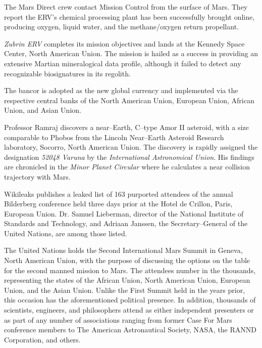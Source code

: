 The Mars Direct crew contact Mission Control from the surface of Mars. They report the ERV's chemical processing plant has been successfully brought online, producing oxygen, liquid water, and the methane/oxygen return propellant.
\StopTimelineDate

{\it Zubrin ERV} completes its mission objectives and lands at the Kennedy Space Center, North American Union. The mission is hailed as a success in providing an extensive Martian mineralogical data profile, although it failed to detect any recognizable biosignatures in its regolith.
\StopTimelineDate

The bancor is adopted as the new global currency and implemented via the respective central banks of the North American Union, European Union, African Union, and Asian Union.
\StopTimelineDate



Professor Ramraj discovers a near--Earth, C--type Amor II asteroid, with a size comparable to Phobos from the Lincoln Near--Earth Asteroid Research laboratory, Socorro, North American Union. The discovery is rapidly assigned the designation {\it 52048 Varuna} by the {\it International Astronomical Union}. His findings are chronicled in the {\it Minor Planet Circular} where he calculates a near collision trajectory with Mars.
\StopTimelineDate

Wikileaks publishes a leaked list of 163 purported attendees of the annual Bilderberg conference held three days prior at the Hotel de Crillon, Paris, European Union. Dr. Samuel Lieberman, director of the National Institute of Standards and Technology, and Adriaan Janssen, the Secretary--General of the United Nations, are among those listed.
\StopTimelineDate

The United Nations holds the Second International Mars Summit in Geneva, North American Union, with the purpose of discussing the options on the table for the second manned mission to Mars. The attendees number in the thousands, representing the states of the African Union, North American Union, European Union, and the Asian Union. Unlike the First Summit held in the years prior, this occasion has the aforementioned political presence. In addition, thousands of scientists, engineers, and philosophers attend as either independent presenters or as part of any number of associations ranging from former Case For Mars conference members to The American Astronautical Society, NASA, the RANND Corporation, and others.

